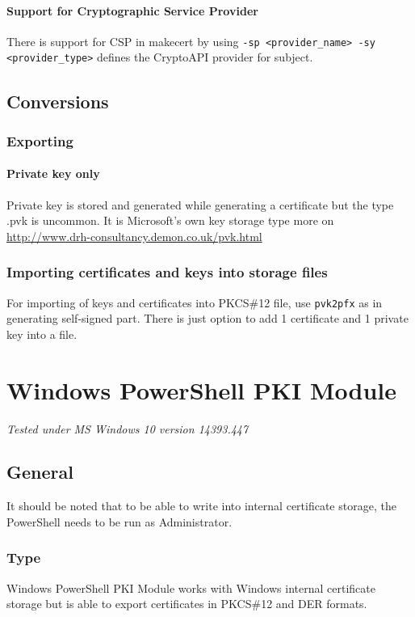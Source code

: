 \documentclass[10pt, a4paper]{report}
\begin{document}
    \subsubsection{Support for Cryptographic Service Provider}
There is support for CSP in makecert by using \verb+-sp <provider_name> -sy <provider_type>+ defines the CryptoAPI provider for subject.
\section{Conversions}

  \subsection{Exporting}
  
    \subsubsection{Private key only}
Private key is stored and generated while generating a certificate but the type .pvk is uncommon. It is Microsoft's own key storage type more on \url{http://www.drh-consultancy.demon.co.uk/pvk.html}

  \subsection{Importing certificates and keys into storage files}
For importing of keys and certificates into PKCS\#12 file, use \verb+pvk2pfx+ as in generating self-signed part. There is just option to add 1 certificate and 1 private key into a file.


\chapter{Windows PowerShell PKI Module}

\textit{Tested under MS Windows 10 version 14393.447}

\section{General}

It should be noted that to be able to write into internal certificate storage, the PowerShell needs to be run as Administrator.
  \subsection{Type}
Windows PowerShell PKI Module works with Windows internal certificate storage but is able to export certificates in PKCS\#12 and DER formats. 
\end{document}
